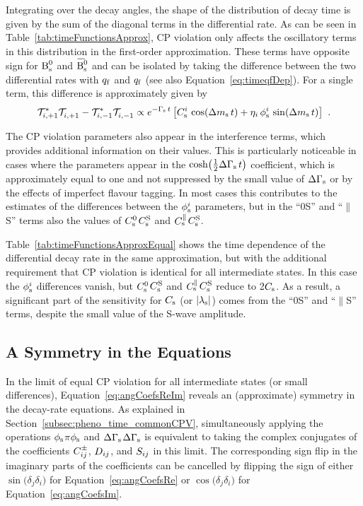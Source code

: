 Integrating over the decay angles, the shape of the distribution of decay time is given by the sum of the diagonal terms in the
differential rate. As can be seen in Table~\ref{tab:timeFunctionsApprox}, CP violation only affects the oscillatory terms in this
distribution in the first-order approximation. These terms have opposite sign for $\Bs$ and $\Bsbar$ and can be isolated by taking the
difference between the two differential rates with $\qf$\texteq{} and $\qf$\texteq{} (see also Equation~\ref{eq:timeqfDep}). For a
single term, this difference is approximately given by
\begin{equation}
  \label{eq:timeOscill}
  \timeAmp[i,+1]^*\timeAmp[i,+1]^{\phantom{*}} - \timeAmp[i,-1]^*\timeAmp[i,-1]^{\phantom{*}}
    \propto \eGst\left[ \Csi\,\cDms + \eta_i\,\phisi\,\sDms \right] \ .
\end{equation}

The CP violation parameters also appear in the interference terms, which provides additional information on their values. This is
particularly noticeable in cases where the parameters appear in the $\cDGs$ coefficient, which is approximately equal to one and not
suppressed by the small value of $\DGs$ or by the effects of imperfect flavour tagging. In most cases this contributes to the estimates of
the differences between the $\phisi$ parameters, but in the ``0S'' and ``$\parallel$S'' terms also the values of $\Cszero$\textplus$\CsS$
and $\Cspar$\textplus$\CsS$.

Table~\ref{tab:timeFunctionsApproxEqual} shows the time dependence of the differential decay rate in the same approximation, but with the
additional requirement that CP violation is identical for all intermediate states. In this case the $\phisi$ differences vanish, but
$\Cszero$\textplus$\CsS$ and $\Cspar$\textplus$\CsS$ reduce to 2$\Cs$. As a result, a significant part of the sensitivity for $\Cs$ (or
$\lamsAbs$) comes from the ``0S'' and ``$\parallel$S'' terms, despite the small value of the S-wave amplitude.


\subsection{A Symmetry in the Equations}
\label{subsec:pheno_equations_symmetry}

In the limit of equal CP violation for all intermediate states (or small differences), Equation~\ref{eq:angCoefsReIm} reveals an
(approximate) symmetry in the decay-rate equations. As explained in Section~\ref{subsec:pheno_time_commonCPV}, simultaneously applying the
operations $\phis$\textto$\pi$\textminus$\phis$ and $\DGs$\textto\tm$\DGs$ is equivalent to taking the complex conjugates of the
coefficients $\Cf[ij]^\pm$, $\Df[ij]$, and $\Sf[ij]$ in this limit. The corresponding sign flip in the imaginary parts of the coefficients
can be cancelled by flipping the sign of either $\sin(\delta_j$\textminus$\delta_i)$ for Equation~\ref{eq:angCoefsRe} or
$\cos(\delta_j$\textminus$\delta_i)$ for Equation~\ref{eq:angCoefsIm}.

